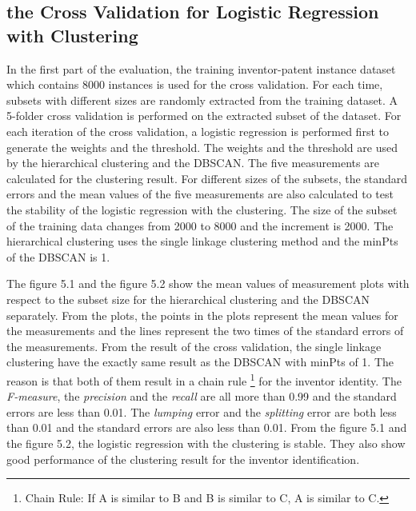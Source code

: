 \subsection{the Cross Validation for Logistic Regression with Clustering}
In the first part of the evaluation, the training inventor-patent instance dataset which contains 8000 instances is used for the cross validation. For each time, subsets with different sizes are randomly extracted from the training dataset. A 5-folder cross validation is performed on the extracted subset of the dataset. For each iteration of the cross validation, a logistic regression is performed first to generate the weights and the threshold. The weights and the threshold are used by the hierarchical clustering and the DBSCAN. The five measurements are calculated for the clustering result. For different sizes of the subsets, the standard errors and the mean values of the five measurements are also calculated to test the stability of the logistic regression with the clustering. The size of the subset of the training data changes from 2000 to 8000 and the increment is 2000. The hierarchical clustering uses the single linkage clustering method and the minPts of the DBSCAN is 1.
\newline

The figure 5.1 and the figure 5.2 show the mean values of measurement plots with respect to the subset size for the hierarchical clustering and the DBSCAN separately. From the plots, the points in the plots represent the mean values for the measurements and the lines represent the two times of the standard errors of the measurements. From the result of the cross validation, the single linkage clustering have the exactly same result as the DBSCAN with minPts of 1. The reason is that both of them result in a chain rule \footnote{Chain Rule: If A is similar to B and B is similar to C, A is similar to C.} for the inventor identity. The \emph{F-measure}, the \emph{precision} and the \emph{recall} are all more than 0.99 and the standard errors are less than 0.01. The \emph{lumping} error and the \emph{splitting} error are both less than 0.01 and the standard errors are also less than 0.01. From the figure 5.1 and the figure 5.2, the logistic regression with the clustering is stable. They also show good performance of the clustering result for the inventor identification.  \newline

